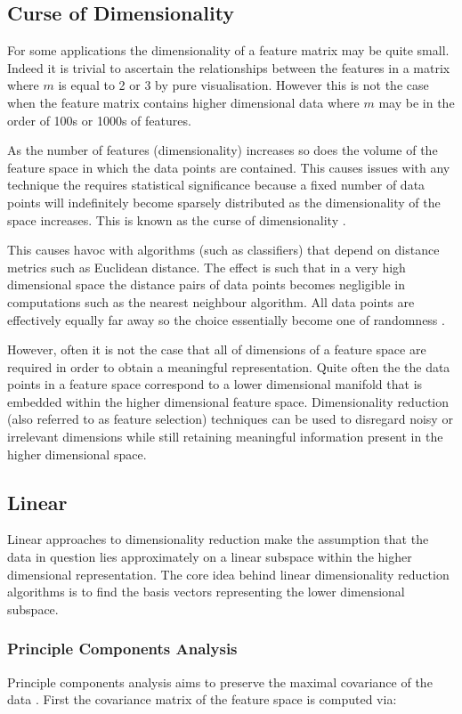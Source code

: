 \subsection{Curse of Dimensionality}
For some applications the dimensionality of a feature matrix may be quite small. Indeed it is trivial to ascertain the relationships between the features in a matrix where $m$ is equal to 2 or 3 by pure visualisation. However this is not the case when the feature matrix contains higher dimensional data where $m$ may be in the order of 100s or 1000s of features.

As the number of features (dimensionality) increases so does the volume of the feature space in which the data points are contained. This causes issues with any technique the requires statistical significance because a fixed number of data points will indefinitely become sparsely distributed as the dimensionality of the space increases. This is known as the curse of dimensionality \cite{bellman1965dynamic}.

This causes havoc with algorithms (such as classifiers) that depend on distance metrics such as Euclidean distance. The effect is such that in a very high dimensional space the distance pairs of data points becomes negligible in computations such as the nearest neighbour algorithm. All data points are effectively equally far away so the choice essentially become one of randomness \cite{domingos2012few}. 

However, often it is not the case that all of dimensions of a feature space are required in order to obtain a meaningful representation. Quite often the the data points in a feature space correspond to a lower dimensional manifold that is embedded within the higher dimensional feature space. Dimensionality reduction (also referred to as feature selection) techniques can be used to disregard noisy or irrelevant dimensions while still retaining meaningful information present in the higher dimensional space.

\subsection{Linear}
Linear approaches to dimensionality reduction make the assumption that the data in question lies approximately on a linear subspace within the higher dimensional representation. The core idea behind linear dimensionality reduction algorithms is to find the basis vectors representing the lower dimensional subspace.

\subsubsection{Principle Components Analysis}
Principle components analysis aims to preserve the maximal covariance of the data \cite{strange2014open}. First the covariance matrix of the feature space is computed via:

